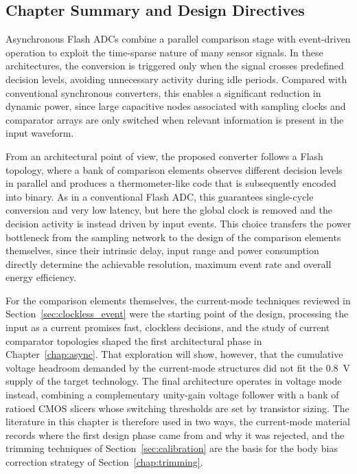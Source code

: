 \subsection{Chapter Summary and Design Directives}

Asynchronous Flash ADCs combine a parallel comparison stage with event-driven operation to exploit the time-sparse nature of many sensor signals. In these architectures, the conversion is triggered only when the signal crosses predefined decision levels, avoiding unnecessary activity during idle periods. Compared with conventional synchronous converters, this enables a significant reduction in dynamic power, since large capacitive nodes associated with sampling clocks and comparator arrays are only switched when relevant information is present in the input waveform.

From an architectural point of view, the proposed converter follows a Flash topology, where a bank of comparison elements observes different decision levels in parallel and produces a thermometer-like code that is subsequently encoded into binary. As in a conventional Flash ADC, this guarantees single-cycle conversion and very low latency, but here the global clock is removed and the decision activity is instead driven by input events. This choice transfers the power bottleneck from the sampling network to the design of the comparison elements themselves, since their intrinsic delay, input range and power consumption directly determine the achievable resolution, maximum event rate and overall energy efficiency.

For the comparison elements themselves, the current-mode techniques reviewed in Section~\ref{sec:clockless_event} were the starting point of the design, processing the input as a current promises fast, clockless decisions, and the study of current comparator topologies shaped the first architectural phase in Chapter~\ref{chap:async}. That exploration will show, however, that the cumulative voltage headroom demanded by the current-mode structures did not fit the $0.8$~V supply of the target technology. The final architecture operates in voltage mode instead, combining a complementary unity-gain voltage follower with a bank of ratioed CMOS slicers whose switching thresholds are set by transistor sizing. The literature in this chapter is therefore used in two ways, the current-mode material records where the first design phase came from and why it was rejected, and the trimming techniques of Section~\ref{sec:calibration} are the basis for the body bias correction strategy of Section~\ref{chap:trimming}.

